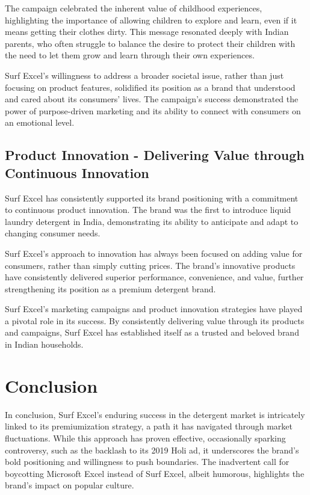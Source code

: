 The campaign celebrated the inherent value of childhood experiences, highlighting the importance of allowing children to explore and learn, even if it means getting their clothes dirty. This message resonated deeply with Indian parents, who often struggle to balance the desire to protect their children with the need to let them grow and learn through their own experiences.

Surf Excel's willingness to address a broader societal issue, rather than just focusing on product features, solidified its position as a brand that understood and cared about its consumers' lives. The campaign's success demonstrated the power of purpose-driven marketing and its ability to connect with consumers on an emotional level.

\subsection{Product Innovation - Delivering Value through Continuous Innovation
}
Surf Excel has consistently supported its brand positioning with a commitment to continuous product innovation. The brand was the first to introduce liquid laundry detergent in India, demonstrating its ability to anticipate and adapt to changing consumer needs.

Surf Excel's approach to innovation has always been focused on adding value for consumers, rather than simply cutting prices. The brand's innovative products have consistently delivered superior performance, convenience, and value, further strengthening its position as a premium detergent brand.

Surf Excel's marketing campaigns and product innovation strategies have played a pivotal role in its success. By consistently delivering value through its products and campaigns, Surf Excel has established itself as a trusted and beloved brand in Indian households.

\section{Conclusion}


In conclusion, Surf Excel's enduring success in the detergent market is intricately linked to its premiumization strategy, a path it has navigated through market fluctuations. While this approach has proven effective, occasionally sparking controversy, such as the backlash to its 2019 Holi ad, it underscores the brand's bold positioning and willingness to push boundaries. The inadvertent call for boycotting Microsoft Excel instead of Surf Excel, albeit humorous, highlights the brand's impact on popular culture.

